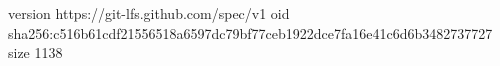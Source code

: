 version https://git-lfs.github.com/spec/v1
oid sha256:c516b61cdf21556518a6597dc79bf77ceb1922dce7fa16e41c6d6b3482737727
size 1138

